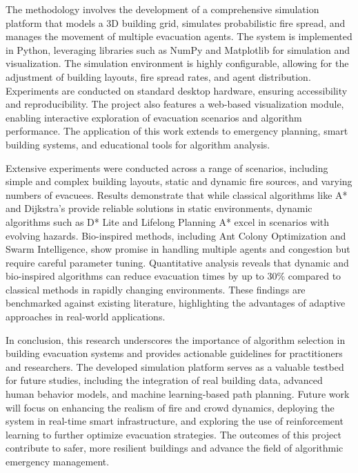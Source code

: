 \documentclass[11pt,a4paper]{report}
\begin{document}
The methodology involves the development of a comprehensive simulation platform that models a 3D building grid, simulates probabilistic fire spread, and manages the movement of multiple evacuation agents. The system is implemented in Python, leveraging libraries such as NumPy and Matplotlib for simulation and visualization. The simulation environment is highly configurable, allowing for the adjustment of building layouts, fire spread rates, and agent distribution. Experiments are conducted on standard desktop hardware, ensuring accessibility and reproducibility. The project also features a web-based visualization module, enabling interactive exploration of evacuation scenarios and algorithm performance. The application of this work extends to emergency planning, smart building systems, and educational tools for algorithm analysis.

Extensive experiments were conducted across a range of scenarios, including simple and complex building layouts, static and dynamic fire sources, and varying numbers of evacuees. Results demonstrate that while classical algorithms like A* and Dijkstra's provide reliable solutions in static environments, dynamic algorithms such as D* Lite and Lifelong Planning A* excel in scenarios with evolving hazards. Bio-inspired methods, including Ant Colony Optimization and Swarm Intelligence, show promise in handling multiple agents and congestion but require careful parameter tuning. Quantitative analysis reveals that dynamic and bio-inspired algorithms can reduce evacuation times by up to 30\% compared to classical methods in rapidly changing environments. These findings are benchmarked against existing literature, highlighting the advantages of adaptive approaches in real-world applications.

In conclusion, this research underscores the importance of algorithm selection in building evacuation systems and provides actionable guidelines for practitioners and researchers. The developed simulation platform serves as a valuable testbed for future studies, including the integration of real building data, advanced human behavior models, and machine learning-based path planning. Future work will focus on enhancing the realism of fire and crowd dynamics, deploying the system in real-time smart infrastructure, and exploring the use of reinforcement learning to further optimize evacuation strategies. The outcomes of this project contribute to safer, more resilient buildings and advance the field of algorithmic emergency management.
\end{document}
